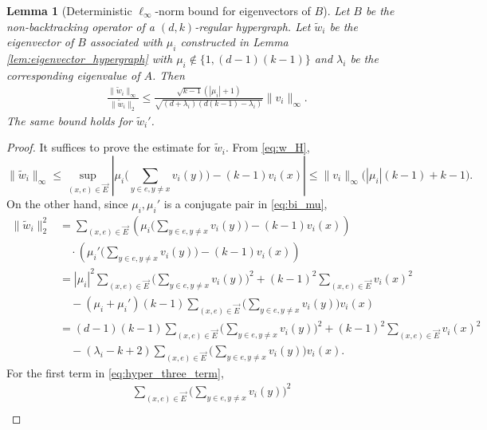 \documentclass[11pt,reqno]{amsart}
\newtheorem{lemma}[theorem]{Lemma}
\theoremstyle{definition}
\begin{document}
\begin{lemma}[Deterministic $\ell_{\infty}$-norm bound for eigenvectors of $B$]
\label{lem:deterministic_H}
    Let $B$ be the non-backtracking operator of a $(d,k)$-regular hypergraph. Let $ \tilde w_i$ be the eigenvector of $B$ 
associated with $ \mu_i$ constructed in Lemma \ref{lem:eigenvector_hypergraph} with $\mu_i\not\in \{ 1, (d-1)(k-1)\}$ and $\lambda_i$ be the corresponding eigenvalue of $A$.   Then 
\begin{align}\label{eq:deterministic_delocalization_2}
    \frac{\|\tilde w_i\|_{\infty}}{\|\tilde w_i\|_2} \leq  \frac{ \sqrt{k-1}(|\mu_i|+1) }{\sqrt{(d+\lambda_i)(d(k-1)-\lambda_i)} } \| v_i \|_{\infty}.
\end{align}
The same bound holds for $\tilde w_i'$.
\end{lemma}
\begin{proof}
    It suffices to prove the estimate for $\tilde w_i$.    From \eqref{eq:w_H},
\begin{equation}\label{eq:infinite_norm_H}
    \| \tilde w_i \|_{\infty}  \leq \sup_{(x,e)  \in \vec{E}} \left| \mu_i \bigg(\sum_{y\in e, y\not=x} v_i(y) \bigg)-(k-1) v_i(x) \right|
    \leq \| v_i \|_{\infty} \bigg( |\mu_i|(k-1) +k-1 \bigg).
\end{equation}
     On the other hand, since $\mu_i,\mu_i'$ is a conjugate pair in \eqref{eq:bi_mu},
     \begin{align}
    \| \tilde w_i \|_2^2 
    &= \sum_{(x,e)  \in \vec{E}} \left( \mu_i \bigg(\sum_{y\in e, y\not=x} v_i(y) \bigg)-(k-1) v_i(x) \right) \\
    &\quad \cdot\left( \mu_i' \bigg(\sum_{y\in e, y\not=x} v_i(y)\bigg)-(k-1) v_i(x) \right) \\
     &= |\mu_i|^2 \sum_{(x,e)  \in \vec{E}} \bigg(\sum_{y\in e, y\not=x} v_i(y) \bigg)^2 + (k-1)^2 \sum_{(x,e)  \in \vec{E}} v_i(x)^2 \\
    &\quad - (\mu_i+\mu_i')(k-1) \sum_{(x,e)  \in \vec{E}} \bigg(\sum_{y\in e, y\not=x} v_i(y) \bigg) v_i(x)\\
    &=(d-1)(k-1)\sum_{(x,e)  \in \vec{E}} \bigg(\sum_{y\in e, y\not=x} v_i(y) \bigg)^2 +(k-1)^2 \sum_{(x,e)  \in \vec{E}} v_i(x)^2\\
    &\quad -(\lambda_i-k+2)\sum_{(x,e)  \in \vec{E}} \bigg(\sum_{y\in e, y\not=x} v_i(y) \bigg) v_i(x) \label{eq:hyper_three_term}. 
\end{align}
For the first term in \eqref{eq:hyper_three_term},
\begin{align}\label{eq:hyper_suqare}
    &\sum_{(x,e)  \in \vec{E}} \bigg(\sum_{y\in e, y\not=x} v_i(y) \bigg)^2 \\

\end{align}
\end{proof}
\end{document}
